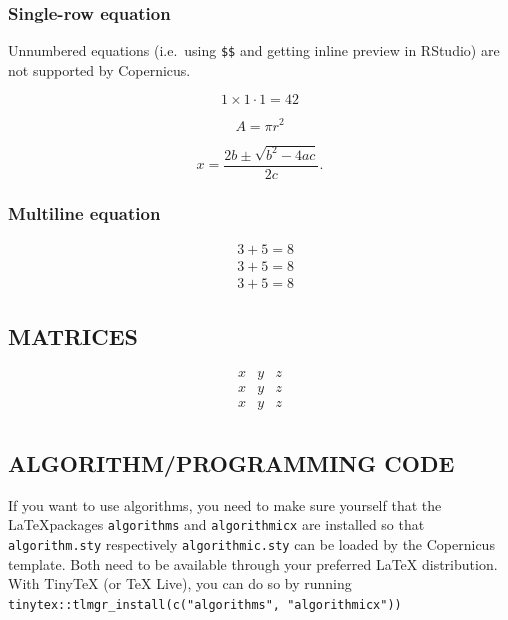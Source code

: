\documentclass[gc, manuscript]{copernicus}
\begin{document}
\subsubsection{Single-row equation}

Unnumbered equations (i.e.~using \texttt{\$\$} and getting inline
preview in RStudio) are not supported by Copernicus.

\begin{equation}
1 \times 1 \cdot 1 = 42
\end{equation}

\begin{equation}
A = \pi r^2
\end{equation}

\begin{equation}
x=\frac{2b\pm\sqrt{b^{2}-4ac}}{2c}.  
\end{equation}

\subsubsection{Multiline equation}

\begin{align}
& 3 + 5 = 8\\
& 3 + 5 = 8\\
& 3 + 5 = 8
\end{align}

\subsection{MATRICES}

\[
\begin{matrix}
x & y & z\\
x & y & z\\
x & y & z\\
\end{matrix}
\]

\subsection{ALGORITHM/PROGRAMMING CODE}

If you want to use algorithms, you need to make sure yourself that the
\LaTeX packages \texttt{algorithms} and \texttt{algorithmicx} are
installed so that \texttt{algorithm.sty} respectively
\texttt{algorithmic.sty} can be loaded by the Copernicus template. Both
need to be available through your preferred \LaTeX{} distribution. With
TinyTeX (or TeX Live), you can do so by running
\texttt{tinytex::tlmgr\_install(c("algorithms",\ "algorithmicx"))}
\end{document}
